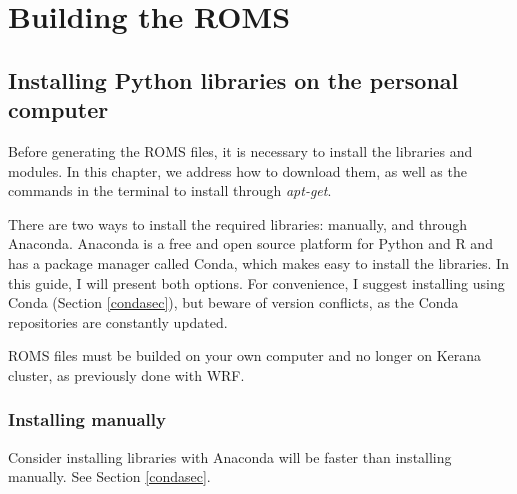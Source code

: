 \chapter{Building the ROMS}
\bigskip
\section{Installing Python libraries on the personal computer}
\bigskip

\noindent Before generating the ROMS files, it is necessary to install the libraries and modules. 
In this chapter, we address how to download them, as well as the commands in the terminal to install through \textit{apt-get}.
\bigskip

\noindent There are two ways to install the required libraries: manually, and through Anaconda. 
Anaconda is a free and open source platform for Python and R and has a package manager called Conda, which makes easy 
to install the libraries. In this guide, I will present both options. For convenience, I suggest installing using Conda 
(Section \textcolor{bleu_cite}{\ref{condasec}}), but beware of version conflicts, as the Conda repositories are constantly updated.
\bigskip

\begin{tcolorbox}[enhanced,
  grow to left by   = 0cm,
  grow to right by  = 0cm,
  enlarge top by    = 0cm,
  enlarge bottom by = 0cm,
  tcbox raise base,
  boxrule           = 1.0pt,
  left              = 18mm,
  colframe          = red!50!black,coltext=red!25!black,colback=red!10!white,
  overlay           = {\begin{tcbclipinterior}\fill[red!75!blue!50!white] (frame.south west)
    rectangle node[text=white,font=\sffamily\bfseries\footnotesize,rotate=0] {WARNING} ([xshift=18mm]frame.north west);\end{tcbclipinterior}}]
ROMS files must be builded on your own computer and no longer on Kerana cluster, as previously done with WRF.
\end{tcolorbox}
\bigskip

\subsection{Installing manually}
\bigskip
\begin{tcolorbox}[enhanced,
    grow to left by   = 0cm,
    grow to right by  = 0cm,
    enlarge top by    = 0cm,
    enlarge bottom by = 0cm,
    tcbox raise base,
    boxrule           = 1.0pt,
    left              = 18mm,
    colframe          = red!50!black,coltext=red!25!black,colback=red!10!white,
    overlay           = {\begin{tcbclipinterior}\fill[red!75!blue!50!white] (frame.south west)
      rectangle node[text=white,font=\sffamily\bfseries\footnotesize,rotate=0] {WARNING} ([xshift=18mm]frame.north west);\end{tcbclipinterior}}]
Consider installing libraries with Anaconda will be faster than installing manually. See Section \textcolor{bleu_cite}{\ref{condasec}}.
  \end{tcolorbox}
\bigskip

